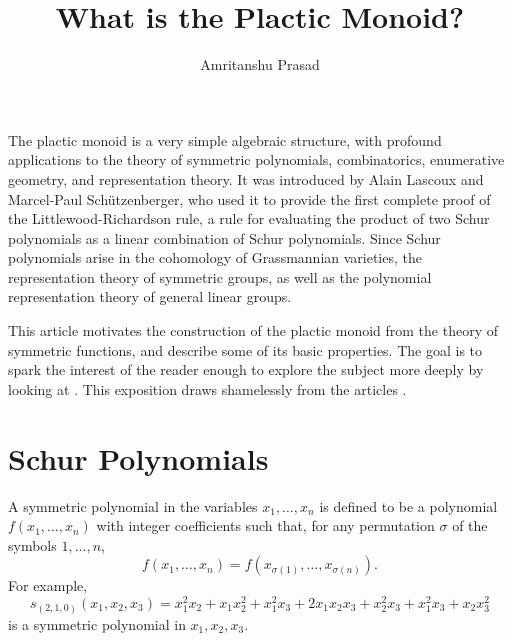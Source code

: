 \documentclass{amsart}
\title{What is the Plactic Monoid?}
\author{Amritanshu Prasad}
\theoremstyle{plain}
\theoremstyle{definition}
\theoremstyle{remark}
\begin{document}
\maketitle
The plactic monoid is a very simple algebraic structure, with profound applications to the theory of symmetric polynomials, combinatorics, enumerative geometry, and representation theory.
It was introduced by Alain Lascoux and Marcel-Paul Sch\"utzenberger, who used it to provide the first complete proof of the Littlewood-Richardson rule, a rule for evaluating the product of two Schur polynomials as a linear combination of Schur polynomials.
Since Schur polynomials arise in the cohomology of Grassmannian varieties, the representation theory of symmetric groups, as well as the polynomial representation theory of general linear groups.

This article motivates the construction of the plactic monoid from the theory of symmetric functions, and describe some of its basic properties.
The goal is to spark the interest of the reader enough to explore the subject more deeply by looking at \cite{fultonyt,Lascoux}.
This exposition draws shamelessly from the articles \cite{plaxique,Lascoux}.
\section{Schur Polynomials}
\label{sec:schur-polynomials}
A symmetric polynomial in the variables $x_1,\dotsc,x_n$ is defined to be a polynomial $f(x_1,\dotsc,x_n)$ with integer coefficients such that, for any permutation $\sigma$ of the symbols $1,\dotsc, n$,
\begin{displaymath}
  f(x_1,\dotsc,x_n) = f(x_{\sigma(1)},\dotsc,x_{\sigma(n)}).
\end{displaymath}
For example,
\begin{equation}
  \label{eq:s210}
  s_{(2,1,0)}(x_1,x_2,x_3) = x_1^2x_2+x_1x_2^2+x_1^2x_3+2x_1x_2x_3+x_2^2x_3+x_1^2x_3+x_2x_3^2
\end{equation}
is a symmetric polynomial in $x_1,x_2,x_3$.
\end{document}
